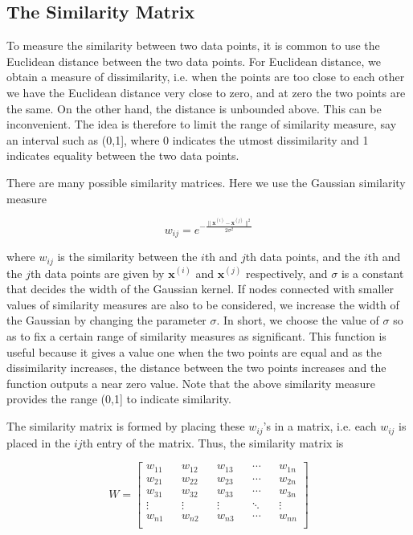 \documentclass[english]{article}
\theoremstyle{plain}
\begin{document}
\subsection{The Similarity Matrix}

To measure the similarity between two data points, it is common to use the Euclidean distance between the two data points. For Euclidean distance, we obtain a measure of dissimilarity, i.e. when the points are too close to each other we have the Euclidean distance very close to zero, and at zero the two points are the same. On the other hand, the distance is unbounded above. This can be inconvenient. The idea is therefore to limit the range of similarity measure, say an interval such as (0,1], where 0 indicates the utmost dissimilarity and 1 indicates equality between the two data points.

There are many possible similarity matrices. Here we use the Gaussian similarity measure

\begin{equation}
w_{ij} = e^{-\frac{\| \boldsymbol{x}^{(i)}-\boldsymbol{x}^{(j)} \|^2}{2 \sigma^2}}
\end{equation}

where $w_{ij}$ is the similarity between the $i$th and $j$th data points, and the $i$th and the $j$th data points are given by $\boldsymbol{x}^{(i)}$ and $\boldsymbol{x}^{(j)}$ respectively, and $\sigma$ is a constant that decides the width of the Gaussian kernel. If nodes connected with smaller values of similarity measures are also to be considered, we increase the width of the Gaussian by changing the parameter $\sigma$. In short, we choose the value of $\sigma$ so as to fix a certain range of similarity measures as significant.
This function is useful because it gives a value one when the two points are equal and as the dissimilarity increases, the distance between the two points increases and the function outputs a near zero value. Note that the above similarity measure provides the range (0,1] to indicate similarity.

The similarity matrix is formed by placing these $w_{ij}$'s in a matrix, i.e. each $w_{ij}$ is placed in the $ij$th entry of the matrix.
Thus, the similarity matrix is

\begin{equation}
W = 
\begin{bmatrix}
w_{11} && w_{12} && w_{13} && \cdots && w_{1n} \\
w_{21} && w_{22} && w_{23} && \cdots && w_{2n} \\
w_{31} && w_{32} && w_{33} && \cdots && w_{3n} \\
\vdots && \vdots && \vdots && \ddots && \vdots \\
w_{n1} && w_{n2} && w_{n3} && \cdots && w_{nn} \\
\end{bmatrix}
\end{equation}
\end{document}
